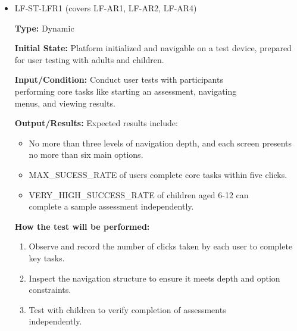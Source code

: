 \documentclass[12pt, titlepage]{article}
\begin{document}
\begin{itemize} 
  \item LF-ST-LFR1 (covers LF-AR1, LF-AR2, LF-AR4) 
  \begin{mdframed}[linewidth=0.5mm] 
    \textbf{Type:} Dynamic \par 
    \textbf{Initial State:} Platform initialized and navigable on a test device, prepared for user testing with adults and children. \par 
    \textbf{Input/Condition:} Conduct user tests with participants \\performing core tasks like starting an assessment, navigating \\menus, and viewing results. \par 
    \textbf{Output/Results:} Expected results include: 
    \begin{itemize} 
      \item No more than three levels of navigation depth, and each screen presents no more than six main options. 
      \item MAX\_SUCESS\_RATE of users complete core tasks within five clicks. 
      \item VERY\_HIGH\_SUCCESS\_RATE of children aged 6-12 can \\complete a sample assessment independently. 
    \end{itemize} \par \textbf{How the test will be performed:} 
    \begin{enumerate}[noitemsep] 
      \item Observe and record the number of clicks taken by each user to complete key tasks. 
      \item Inspect the navigation structure to ensure it meets depth and option constraints. 
      \item Test with children to verify completion of assessments \\independently. 
    \end{enumerate} 
  \end{mdframed}


\end{itemize}
\end{document}
